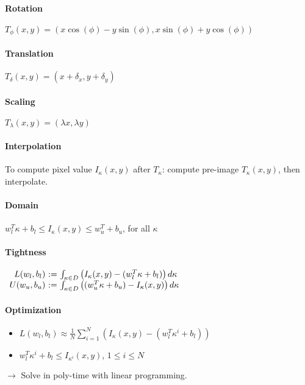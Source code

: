 \paragraph{Rotation}
$T_\phi(x, y) = (x \cos(\phi) -  y \sin(\phi), x \sin(\phi) + y \cos(\phi))$

\paragraph{Translation} $T_\delta(x, y) = (x + \delta_x, y + \delta_y)$

\paragraph{Scaling}
$T_\lambda(x, y) = (\lambda x, \lambda y)$

\paragraph{Interpolation} To compute pixel value $I_\kappa(x, y)$ after $T_\kappa$: compute pre-image $T_\kappa(x, y)$, then interpolate. 

\paragraph{Domain}
$w_l^T \kappa + b_l \le I_\kappa(x, y) \le w_u^T + b_u$, for all $\kappa$

\paragraph{Tightness}
$\begin{array}{r@{~:=~}l}
L(w_l, b_l) & \int_{\kappa\in D} \left(I_\kappa(x, y) - (w_l^T\kappa + b_l)\right) d\kappa \\
U(w_u, b_u) & \int_{\kappa\in D} \left((w_u^T\kappa + b_u) - I_\kappa(x, y)\right) d\kappa
\end{array}$

\paragraph{Optimization}
\begin{itemize}
\item $L(w_l, b_l) \approx \frac{1}{N} \sum_{i=1}^N \left(I_\kappa(x, y) - (w_l^T\kappa^i + b_l)\right)$
\item $w_l^T\kappa^i + b_l \le I_{\kappa^i}(x, y)$, $1 \le i \le N$
\end{itemize}
$\rightarrow$ Solve in poly-time with linear programming. 
